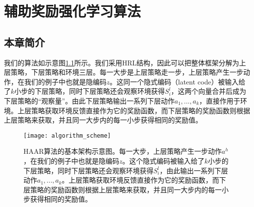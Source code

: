 %
%
%
%
%
%
%
%
%
%
%
%
%

\chapter{辅助奖励强化学习算法}

\section{本章简介}
我们的算法如示意图\ref{fig:algorithm_scheme}所示。我们采用HRL结构，因此可以把整体框架分解为上层策略，下层策略和环境三层。每一大步是上层策略走一步，上层策略产生一步动作，在我们的例子中也就是隐编码$z$。这同一个隐式编码（latent code）被输入给了$k$小步的下层策略，同时下层策略还会观察环境获得$S_i^l$，这两个向量合并后成为下层策略的``观察量''。由此下层策略输出一系列下层动作$a_1, ..., a_k$，直接作用于环境。上层策略获取环境反馈直接作为它的奖励函数，而下层策略的奖励函数则根据上层策略来获取，并且同一大步内的每一小步获得相同的奖励值。

\begin{figure}[H] %
  \centering
  \texttt{[image: algorithm\_scheme]}
  \caption{HAAR算法的基本架构示意图。每一大步，上层策略产生一步动作$a^h$，在我们的例子中也就是隐编码$z$。这个隐式编码被输入给了$k$小步的下层策略，同时下层策略还会观察环境获得$S_i^l$，由此输出一系列下层动作$a_1, ..., a_k$。上层策略获取环境反馈直接作为它的奖励函数，而下层策略的奖励函数则根据上层策略来获取，并且同一大步内的每一小步获得相同的奖励值。}
  \label{fig:algorithm_scheme}
\end{figure}


